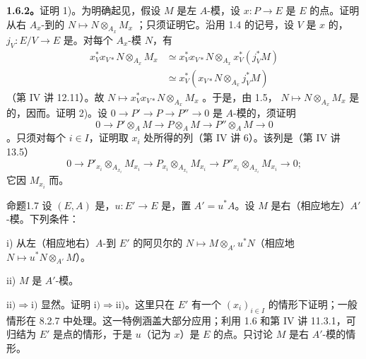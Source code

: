 \textbf{1.6.2。}证明 1)。为明确起见，假设 $M$ 是左 $A$-模，设 $x:P\to E$ 是 $E$ 的点。证明从右 $A_x$-到的 $N\mapsto N\otimes_{A_x}M_x$ ；只须证明它。沿用 1.4 的记号，设 $V$ 是 $x$ 的，$j_V:E/V\to E$ 是。对每个 $A_x$-模 $N$，有
\[
\begin{split}
 x_V^*x_{V*}N\otimes_{A_x}M_x
 &\simeq x_V^*x_{V*}N\otimes_{A_x}x_V^*(j_V^*M)\\
 &\simeq x_V^*(x_{V*}N\otimes_{A_x}j_V^*M)
\end{split}
\]
（第 IV 讲 12.11）。故 $N\mapsto x_V^*x_{V*}N\otimes_{A_x}M_x$ 。于是，由 1.5， $N\mapsto N\otimes_{A_x}M_x$ 是的，因而。证明 2)。设 $0\to P'\to P\to P''\to0$ 是 $A$-模的，须证明
\[
 0\longrightarrow P'\otimes_AM\longrightarrow P\otimes_AM
 \longrightarrow P''\otimes_AM\longrightarrow0
\]
。只须对每个 $i\in I$，证明取 $x_i$ 处所得的列（第 IV 讲 6）。该列是（第 IV 讲 13.5）
\[
 0\to P'_{x_i}\otimes_{A_{x_i}}M_{x_i}\to P_{x_i}\otimes_{A_{x_i}}M_{x_i}
 \to P''_{x_i}\otimes_{A_{x_i}}M_{x_i}\to0;
\]
它因 $M_{x_i}$ 而。
\begin{SGAresult}{命题}{1.7}
设 $(E,A)$ 是，$u:E'\to E$ 是，置 $A'=u^*A$。设 $M$ 是右（相应地左）$A'$-模。下列条件：

\noindent i) 从左（相应地右）$A$-到 $E'$ 的阿贝尔的 $N\mapsto M\otimes_{A'}u^*N$（相应地 $N\mapsto u^*N\otimes_{A'}M$）。

\noindent ii) $M$ 是 $A'$-模。
\end{SGAresult}
$\mathrm{ii})\Rightarrow\mathrm{i})$ 显然。证明 $\mathrm{i})\Rightarrow\mathrm{ii})$。这里只在 $E'$ 有一个 $(x_i)_{i\in I}$ 的情形下证明；一般情形在 8.2.7 中处理。这一特例涵盖大部分应用；利用 1.6 和第 IV 讲 11.3.1，可归结为 $E'$ 是点的情形，于是 $u$（记为 $x$）是 $E$ 的点。只讨论 $M$ 是右 $A'$-模的情形。
